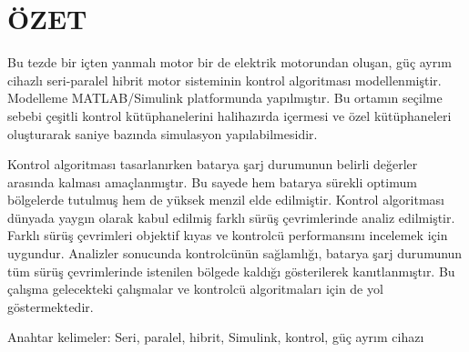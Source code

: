 


\chapter{ÖZET}

Bu tezde bir içten yanmalı motor bir de elektrik motorundan oluşan, 
güç ayrım cihazlı seri-paralel hibrit motor sisteminin kontrol algoritması modellenmiştir.
Modelleme MATLAB/Simulink platformunda yapılmıştır. Bu ortamın seçilme sebebi çeşitli kontrol kütüphanelerini
halihazırda içermesi ve özel kütüphaneleri oluşturarak saniye bazında simulasyon yapılabilmesidir.

Kontrol algoritması tasarlanırken batarya şarj durumunun belirli değerler arasında kalması amaçlanmıştır.
Bu sayede hem batarya sürekli optimum bölgelerde
tutulmuş hem de yüksek menzil elde edilmiştir. Kontrol algoritması dünyada yaygın olarak kabul edilmiş
farklı sürüş çevrimlerinde analiz edilmiştir. Farklı sürüş çevrimleri objektif kıyas ve
kontrolcü performansını incelemek için uygundur.
Analizler sonucunda kontrolcünün sağlamlığı, batarya şarj durumunun tüm sürüş çevrimlerinde istenilen bölgede kaldığı gösterilerek
kanıtlanmıştır. Bu çalışma gelecekteki çalışmalar ve kontrolcü algoritmaları için de yol göstermektedir. 

Anahtar kelimeler: Seri, paralel, hibrit, Simulink, kontrol, güç ayrım cihazı